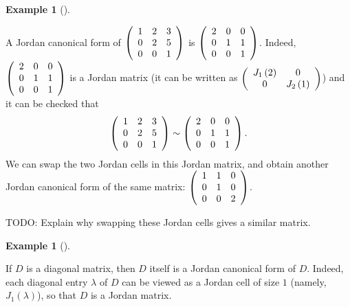 \documentclass[numbers=enddot,12pt,final,onecolumn,notitlepage]{scrartcl}%
\numberwithin{exer}{subsection}
\theoremstyle{definition}
\newtheorem{exam}[theo]{Example}
\newenvironment{example}[1][]
{\begin{exam}[#1]\begin{leftbar}}
{\end{leftbar}\end{exam}}
\begin{document}
\begin{example}
A Jordan canonical form of $\left(
\begin{array}
[c]{ccc}%
1 & 2 & 3\\
0 & 2 & 5\\
0 & 0 & 1
\end{array}
\right)  $ is $\left(
\begin{array}
[c]{ccc}%
2 & 0 & 0\\
0 & 1 & 1\\
0 & 0 & 1
\end{array}
\right)  $. Indeed, $\left(
\begin{array}
[c]{ccc}%
2 & 0 & 0\\
0 & 1 & 1\\
0 & 0 & 1
\end{array}
\right)  $ is a Jordan matrix (it can be written as $\left(
\begin{array}
[c]{cc}%
J_{1}\left(  2\right)  & 0\\
0 & J_{2}\left(  1\right)
\end{array}
\right)  $) and it can be checked that%
\[
\left(
\begin{array}
[c]{ccc}%
1 & 2 & 3\\
0 & 2 & 5\\
0 & 0 & 1
\end{array}
\right)  \sim\left(
\begin{array}
[c]{ccc}%
2 & 0 & 0\\
0 & 1 & 1\\
0 & 0 & 1
\end{array}
\right)  .
\]
We can swap the two Jordan cells in this Jordan matrix, and obtain another
Jordan canonical form of the same matrix: $\left(
\begin{array}
[c]{ccc}%
1 & 1 & 0\\
0 & 1 & 0\\
0 & 0 & 2
\end{array}
\right)  $.
\end{example}

TODO: Explain why swapping these Jordan cells gives a similar matrix.

\begin{example}
If $D$ is a diagonal matrix, then $D$ itself is a Jordan canonical form of
$D$. Indeed, each diagonal entry $\lambda$ of $D$ can be viewed as a Jordan
cell of size $1$ (namely, $J_{1}\left(  \lambda\right)  $), so that $D$ is a
Jordan matrix.
\end{example}
\end{document}
